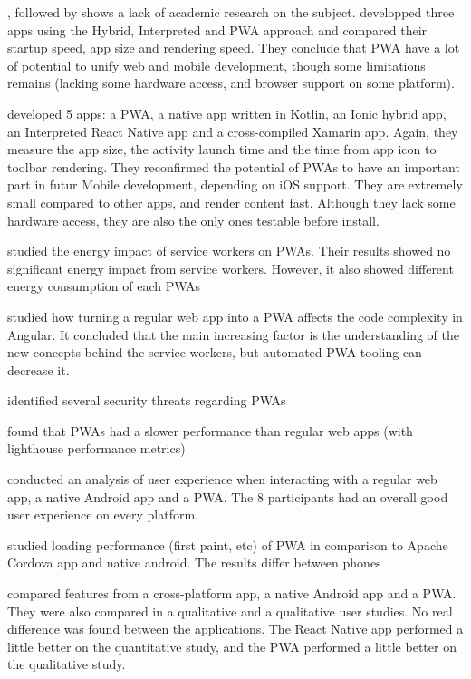     \cite{PWApossibleUnifer}, followed by \cite{Biorn-Hansen2} shows a lack of academic research on the subject. \cite{PWApossibleUnifer} developped three apps using the Hybrid, Interpreted and PWA approach and compared their startup speed, app size and rendering speed. They conclude that PWA have a lot of potential to unify web and mobile development, though some limitations remains (lacking some hardware access, and browser support on some platform).
    
    \cite{Biorn-Hansen2} developed 5 apps: a PWA, a native app written in Kotlin, an Ionic hybrid app, an Interpreted React Native app and a cross-compiled Xamarin app. Again, they measure the app size, the activity launch time and the time from app icon to toolbar rendering. They reconfirmed the potential of PWAs to have an important part in futur Mobile development, depending on iOS support. They are extremely small compared to other apps, and render content fast. Although they lack some hardware access, they are also the only ones testable before install. 
    
    \cite{SW_and_energy} studied the energy impact of service workers on PWAs. Their results showed no significant energy impact from service workers. However, it also showed different energy consumption of each PWAs
    
    \cite{JohannsenFabian2018PWAa} studied how turning a regular web app into a PWA affects the code complexity in Angular. It concluded that the main increasing factor is the understanding of the new concepts behind the service workers, but automated PWA tooling can decrease it.
    
    \cite{Pride_Prejudice} identified several security threats regarding PWAs
    
    \cite{bac_pwa_comparison} found that PWAs had a slower performance than regular web apps (with lighthouse performance metrics)
    
    \cite{PWA_UX_comparison_study} conducted an analysis of user experience when interacting with a regular web app, a native Android app and a PWA. The 8 participants had an overall good user experience on every platform.
    
    \cite{bac_pwa_performance} studied loading performance (first paint, etc) of PWA in comparison to Apache Cordova app and native android. The results differ between phones %
    
    \cite{emulating_native_w_crossplatform} compared features from a cross-platform app, a native Android app and a PWA. They were also compared in a qualitative and a qualitative user studies. No real difference was found between the applications. The React Native app performed a little better on the quantitative study, and the PWA performed a little better on the qualitative study.
    
